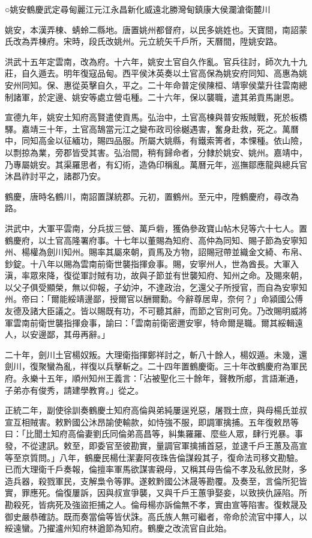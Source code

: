 
\begin{pinyinscope}
○姚安鶴慶武定尋甸麗江元江永昌新化威遠北勝灣甸鎮康大侯瀾滄衛麓川

姚安，本漢弄棟、蜻蛉二縣地。唐置姚州都督府，以民多姚姓也。天寶間，南詔蒙氏改為弄棟府。宋時，段氏改姚州。元立統矢千戶所，天曆間，陞姚安路。

洪武十五年定雲南，改為府。十六年，姚安土官自久作亂。官兵往討，師次九十九莊，自久遁去。明年復寇品甸。西平侯沐英奏以土官高保為姚安府同知、高惠為姚安州同知。保、惠從英擊自久，平之。二十年命普定侯陳桓、靖寧侯葉升往雲南總制諸軍，於定邊、姚安等處立營屯種。二十六年，保以襲職，遣其弟貢馬謝恩。

宣德九年，姚安土知府高賢遣使貢馬。弘治中，土官高棟與普安叛賊戰，死於板橋驛。嘉靖三十年，土官高鵠當元江之變布政司徐樾遇害，奮身赴救，死之。萬曆中，同知高金以征緬功，賜四品服。所屬大姚縣，有鐵索箐者，本惈種。依山險，以剽掠為業，旁郡皆受其害。弘治間，稍有歸命者，分隸於姚安、姚州。嘉靖中，乃專屬姚安。其渠羅思者，有幻術，造偽印稱亂。萬曆元年，巡撫鄒應龍與總兵官沐昌祚討平之，諸郡乃安。

鶴慶，唐時名鶴川，南詔置謀統郡。元初，置鶴州。至元中，陞鶴慶府，尋改為路。

洪武中，大軍平雲南，分兵拔三營、萬戶砦，獲偽參政寶山帖木兒等六十七人。置鶴慶府，以土官高隆署府事。十七年以董賜為知府、高仲為同知、賜子節為安寧知州、楊權為劍川知州。賜率其屬來朝，貢馬及方物，詔賜冠帶並織金文綺、布帛、鈔錠。十八年以賜為雲南前衛世襲指揮僉事。賜，安寧州人，世為酋長。大軍入滇，率眾來降，復從軍討賊有功，故與子節並有世襲知府、知州之命。及賜來朝，以父子俱受顯榮，無以仰報，子幼沖，不達政治，乞還父子所授官，而自為安寧知州。帝曰：「爾能綏靖邊鄙，授爾官以酬爾勳。今辭尊居卑，奈何？」命潁國公傅友德及諸大臣議之。皆以賜既有功，不可聽其辭，而節之官則可免。乃改賜明威將軍雲南前衛世襲指揮僉事，諭曰：「雲南前衛密邇安寧，特命爾是職。爾其綏輯遠人，以安邊鄙，其毋再辭。」

二十年，劍川土官楊奴叛。大理衛指揮鄭祥討之，斬八十餘人，楊奴遁。未幾，還劍川，復聚蠻為亂，祥復以兵擊斬之。二十四年置鶴慶衛。三十年改鶴慶府為軍民府。永樂十五年，順州知州王義言：「沾被聖化三十餘年，聲教所郕，言語漸通，子弟亦有俊秀，請建學教育。」從之。

正統二年，副使徐訓奏鶴慶土知府高倫與弟純屢逞兇惡，屠戮士庶，與母楊氏並叔宣互相賊害。敕黔國公沐昂諭使輸款，如恃強不服，即調軍擒捕。五年復敕昂等曰：「比聞土知府高倫妻劉氏同倫弟高昌等，糾集羅羅、麼些人眾，肆行兇暴。事發，不從逮訊。敕至，即委官至彼勘實，量調官軍擒捕首惡，並逮千戶王蕙及高宣等至京質問。」八年，鶴慶民楊仕潔妻阿夜珠告倫謀殺其子，復命法司移文勘驗。已而大理衛千戶奏報，倫擅率軍馬欲謀害親母，又稱其母告倫不孝及私斂民財，多造兵器，殺戮軍民，支解梟令等罪。遂敕黔國公沐晟等勘覆。及奏至，言倫所犯皆實，罪應死。倫復屢訴，因與叔宣爭襲，又與千戶王蕙爭娶妾，以致挾仇誣陷。所勘殺死，皆病死及強盜拒捕之人。倫母楊亦訴倫無不孝，實由宣等陷害。復敕晟及御史嚴恭確訪。既而奏當倫等皆伏誅。高氏族人無可繼者，帝命於流官中擇人，以綏遠蠻。乃擢瀘州知府林遒節為知府。鶴慶之改流官自此始。


\end{pinyinscope}
